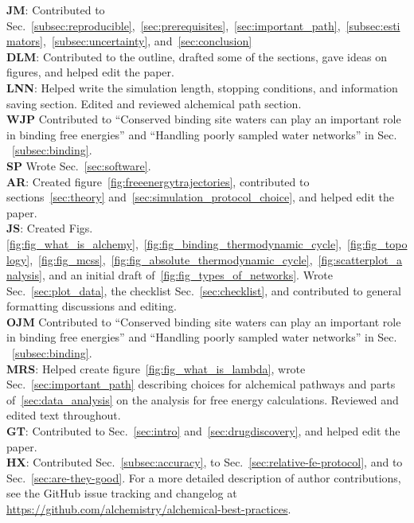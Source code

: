 \documentclass[9pt,bestpractices]{livecoms}
\newcommand{\githubrepository}{\url{https://github.com/alchemistry/alchemical-best-practices}} %
\begin{document}
\textbf{JM}: Contributed to Sec.~\ref{subsec:reproducible},~\ref{sec:prerequisites},~\ref{sec:important_path},~\ref{subsec:estimators},~\ref{subsec:uncertainty}, and~\ref{sec:conclusion}\\
\textbf{DLM}: Contributed to the outline, drafted some of the sections, gave ideas on figures, and helped edit the paper.\\
\textbf{LNN}: Helped write the simulation length, stopping conditions, and information saving section. Edited and reviewed alchemical path section.\\
\textbf{WJP} Contributed to ``Conserved binding site waters can play an important role in binding free energies'' and ``Handling poorly sampled water networks'' in Sec. ~\ref{subsec:binding}.\\
\textbf{SP} Wrote Sec.~\ref{sec:software}. \\
\textbf{AR}: Created figure~\ref{fig:freeenergytrajectories}, contributed to sections~\ref{sec:theory} and~\ref{sec:simulation_protocol_choice}, and helped edit the paper.\\
\textbf{JS}: Created Figs.~ \ref{fig:fig_what_is_alchemy},~\ref{fig:fig_binding_thermodynamic_cycle},~\ref{fig:fig_topology},~\ref{fig:fig_mcss},~\ref{fig:fig_absolute_thermodynamic_cycle},~\ref{fig:scatterplot_analysis}, and an initial draft of~\ref{fig:fig_types_of_networks}. Wrote Sec.~\ref{sec:plot_data}, the checklist Sec.~\ref{sec:checklist}, and contributed to general formatting discussions and editing.\\
\textbf{OJM} Contributed to ``Conserved binding site waters can play an important role in binding free energies'' and ``Handling poorly sampled water networks'' in Sec. ~\ref{subsec:binding}.\\
\textbf{MRS}: Helped create figure~\ref{fig:fig_what_is_lambda}, wrote Sec.~\ref{sec:important_path} describing choices for alchemical pathways and parts of~\ref{sec:data_analysis} on the analysis for free energy calculations. Reviewed and edited text throughout.\\
\textbf{GT}: Contributed to Sec.~\ref{sec:intro} and~\ref{sec:drugdiscovery}, and helped edit the paper.\\
\textbf{HX}: Contributed Sec.~\ref{subsec:accuracy}, to Sec.~\ref{sec:relative-fe-protocol}, and to Sec.~\ref{sec:are-they-good}.
For a more detailed description of author contributions,
see the GitHub issue tracking and changelog at \githubrepository.
\end{document}
